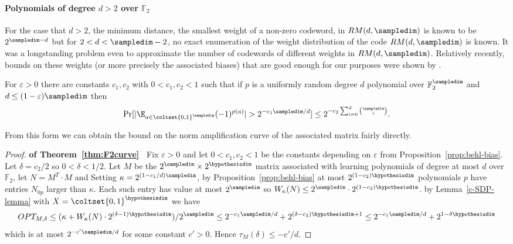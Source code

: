 
\paragraph{Polynomials of degree $d>2$ over $\mathbb{F}_2$}
For the case that $d>2$, the minimum distance, the smallest 
weight of a non-zero codeword, in $RM(d,\sampledim)$ is known to be $2^{\sampledim-d}$ but
for $2<d<\sampledim-2$, no exact enumeration of the weight distribution of the code
$RM(d,\sampledim)$ is known.
It was a longstanding problem even to approximate the
number of codewords of different weights in $RM(d,\sampledim)$.  
Relatively recently, bounds on
these weights (or more precisely the associated biases) that are good enough
for our purposes were shown by
\cite{DBLP:journals/cc/Ben-EliezerHL12}.

\begin{proposition}
\label{prop:behl-bias}
For $\varepsilon>0$ there are constants $c_1, c_2$ with $0<c_1,c_2<1$ such that if $p$ is a uniformly random degree $d$ polynomial over
$\mathbb{F}^\sampledim_2$ and $d\le (1-\varepsilon)\sampledim$ then 
$$\Pr[|\E_{a\in \coltset{0,1}^\sampledim} (-1)^{p(a)}|>2^{-c_1 \sampledim/d}]\le 2^{-c_2 \sum_{i=0}^d \binom{\sampledim}{i}}.$$
\end{proposition}

From this form we can obtain the bound on the norm amplification curve
of the associated matrix fairly directly.
\medskip

\begin{proof}{\bfseries\upshape of Theorem~\ref{thm:F2curve}\ }
Fix $\varepsilon>0$ and let $0<c_1, c_2<1$ be the constants depending on
$\varepsilon$ from Proposition~\ref{prop:behl-bias}.
Let $\delta=c_2/2$ so $0<\delta<1/2$.
Let $M$ be the $2^\sampledim\times 2^\hypothesisdim$ matrix associated with learning 
polynomials of degree at most $d$ over $\mathbb{F}_2$, let $N=M^T\cdot M$ and
Setting $\kappa=2^{(1-c_1/d)\sampledim}$, by Proposition~\ref{prop:behl-bias} at
most $2^{(1-c_2)\hypothesisdim}$ 
polynomials $p$ have entries $N_{0p}$ larger than $\kappa$.
Each such entry has value at most $2^\sampledim$ so 
$W_\kappa(N)\le 2^\sampledim\cdot 2^{(1-c_2)\hypothesisdim}$.
by Lemma~\ref{c-SDP-lemma} with 
$X=\coltset{0,1}^\hypothesisdim$ we have
$$OPT_{M,\delta}\le (\kappa+W_\kappa(N)\cdot 2^{(\delta-1)\hypothesisdim})/2^\sampledim
\le 2^{-c_1 \sampledim/d}+2^{(\delta - c_2)\hypothesisdim+1}\le 2^{-c_1 \sampledim/d}+2^{1-\delta \hypothesisdim}$$
which is at most $2^{-c' \sampledim/d}$ for some constant $c'>0$. 
Hence $\tau_M(\delta)\le -c'/d$.
\end{proof}

